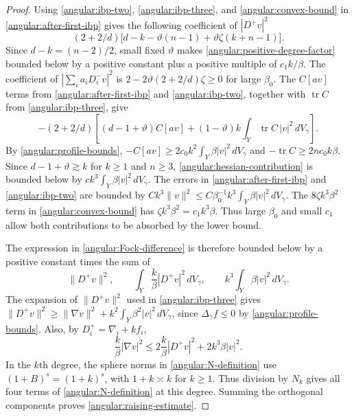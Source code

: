 \documentclass[11pt,a4paper]{article}
\theoremstyle{definition}
\theoremstyle{remark}
\DeclareMathOperator{\tr}{tr}
\numberwithin{equation}{section}
\begin{document}
\begin{proof}
Using \eqref{angular:ibp-two}, \eqref{angular:ibp-three}, and
\eqref{angular:convex-bound} in \eqref{angular:after-first-ibp}
gives the following coefficient of $|D^+v|^2$
\begin{equation}\label{angular:positive-degree-factor}
 (2+2/d)\bigl[d-k-\vartheta(n-1)
                         +\vartheta\zeta(k+n-1)\bigr].
\end{equation}
Since $d-k=(n-2)/2$, small fixed $\vartheta$ makes
\eqref{angular:positive-degree-factor} bounded below by a positive
constant plus a positive multiple of $c_1 k/\beta$. The coefficient
of $|\sum_i a_iD_i^-v|^2$ is $2-2\vartheta(2+2/d)\zeta\ge0$
for large $\beta_0$. The $C[av]$ terms from
\eqref{angular:after-first-ibp} and \eqref{angular:ibp-two},
together with $\tr C$ from \eqref{angular:ibp-three}, give
\begin{equation}\label{angular:hessian-contribution}
 -(2+2/d)\left[(d-1+\vartheta)C[av]
       +(1-\vartheta)k\int_Y\tr C\,|v|^2\,dV_\gamma\right].
\end{equation}
By \eqref{angular:profile-bounds},
$-C[av]\ge 2c_0 k^2\int_Y\beta|v|^2\,dV_\gamma$
and $-\tr C\ge 2nc_0 k\beta$. Since $d-1+\vartheta\gtrsim k$
for $k\ge1$ and $n\ge3$, \eqref{angular:hessian-contribution} is
bounded below by $c k^3\int_Y\beta|v|^2\,dV_\gamma$. The errors in
\eqref{angular:after-first-ibp} and \eqref{angular:ibp-two} are
bounded by $C k^3\|v\|^2\le C\beta_0^{-1}k^3\int_Y\beta|v|^2\,dV_\gamma$.
The $8\zeta k^3\beta^2$ term in \eqref{angular:convex-bound} has
$\zeta k^3\beta^2=c_1 k^3\beta$. Thus large $\beta_0$ and small $c_1$
allow both contributions to be absorbed by the lower bound.

The expression in \eqref{angular:Fock-difference} is therefore
bounded below by a positive constant times the sum of
\[
 \|D^+v\|^2,\qquad
 \int_Y\frac{k}{\beta}|D^+v|^2\,dV_\gamma,
 \qquad k^3\int_Y\beta|v|^2\,dV_\gamma.
\]
The expansion of $\|D^+v\|^2$ used in \eqref{angular:ibp-three}
gives $\|D^+v\|^2\ge \|\nabla v\|^2+k^2\int_Y\beta^2|v|^2\,dV_\gamma$,
since $\Delta_\gamma f\le0$ by \eqref{angular:profile-bounds}.
Also, by $D_i^+=\nabla_i+kf_i$,
\[
 \frac{k}{\beta}|\nabla v|^2
 \le2\frac{k}{\beta}|D^+v|^2+2k^3\beta|v|^2.
\]
In the $k$th degree, the sphere norms in \eqref{angular:N-definition}
use $(1+B)^s=(1+k)^s$, with $1+k\asymp k$ for $k\ge1$.
Thus division by $N_k$ gives all four terms of
\eqref{angular:N-definition} at this degree. Summing the orthogonal
components proves \eqref{angular:raising-estimate}.
\end{proof}
\end{document}
